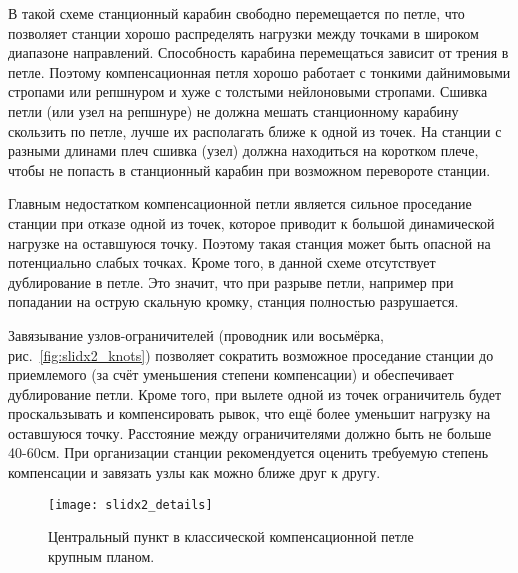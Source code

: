 \documentclass[fleqn, 12pt]{extarticle}
\begin{document}
    В такой схеме станционный карабин свободно перемещается по петле, что позволяет станции хорошо распределять
    нагрузки между точками в широком диапазоне направлений.
    Способность карабина перемещаться зависит от трения в петле. Поэтому компенсационная петля хорошо работает с тонкими дайнимовыми стропами или репшнуром и хуже
    с толстыми нейлоновыми стропами. Сшивка петли (или узел на репшнуре) не должна мешать станционному карабину скользить по петле, лучше их располагать ближе к одной из точек.
    На станции с разными длинами плеч сшивка (узел) должна находиться на коротком плече, чтобы не попасть в станционный карабин при возможном перевороте станции.
    
	Главным недостатком компенсационной петли является сильное проседание станции при отказе одной из точек, которое приводит к большой динамической нагрузке на оставшуюся точку.
    Поэтому такая станция может быть опасной на потенциально слабых точках. Кроме того, в данной схеме отсутствует дублирование в петле. Это значит, что при разрыве петли, например
    при попадании на острую скальную кромку, станция полностью разрушается.
    
    Завязывание узлов-ограничителей (проводник или восьмёрка, рис.~\ref{fig:slidx2_knots}) позволяет сократить возможное проседание станции до приемлемого (за счёт уменьшения степени компенсации)
    и обеспечивает дублирование петли. Кроме того, при вылете одной из точек ограничитель будет
    проскальзывать и компенсировать рывок, что ещё более уменьшит нагрузку на оставшуюся точку.
    Расстояние между ограничителями должно быть не больше 40-60см. При организации станции рекомендуется оценить требуемую степень компенсации и завязать узлы как можно ближе друг к другу. 
    
    \begin{figure}
        \centering
        \texttt{[image: slidx2\_details]}
        \caption{Центральный пункт в классической компенсационной петле крупным планом.}\label{fig:slidx2_details}
    \end{figure}
    
\end{document}
